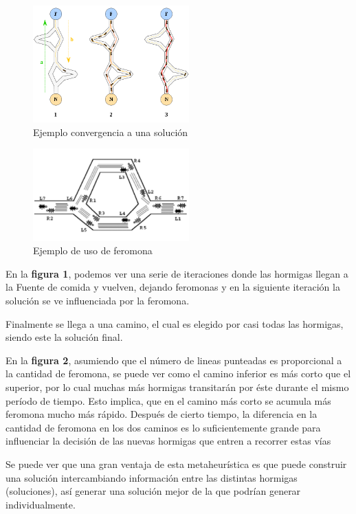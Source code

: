 \begin{figure}[h]
\centering
\caption{Ejemplo convergencia a una solución}
\includegraphics[width=6cm]{imagenes/feromona}
\end{figure}

\begin{figure}[h]
\caption{Ejemplo de uso de feromona}
\centering
\includegraphics[width=6cm]{imagenes/feromona2}
\end{figure}

En la \textbf{figura 1}, podemos ver una serie de iteraciones donde las hormigas llegan a la Fuente de comida y vuelven, dejando feromonas y en la siguiente iteración la solución se ve influenciada por la feromona. 

Finalmente se llega a una camino, el cual es elegido por casi todas las hormigas, siendo este la soluci\'on final.

En la \textbf{figura 2}, asumiendo que el número de lineas punteadas es proporcional a la cantidad de feromona, se puede ver como el camino inferior es más corto que el superior, por lo cual muchas más hormigas transitarán por éste durante el mismo per\'iodo de tiempo. Esto implica, que en el camino más corto se acumula más feromona mucho más rápido. Después de cierto tiempo, la diferencia en la cantidad de feromona en los dos caminos es lo suficientemente grande para influenciar la decisión de las nuevas hormigas que entren a recorrer estas vías

Se puede ver que una gran ventaja de esta metaheurística es que puede construir una solución intercambiando información entre las distintas hormigas (soluciones), así generar una solución mejor de la que podrían generar individualmente.

